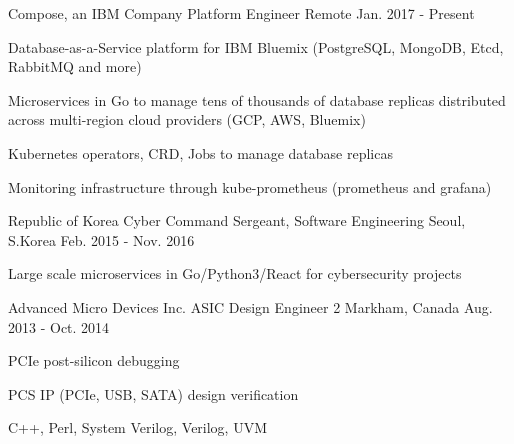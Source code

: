 

\begin{cventries}

  \cventry
    {Compose, an IBM Company} %
    {Platform Engineer} %
    {Remote} %
    {Jan. 2017 - Present} %
    {
      \begin{cvitems} %
        \item {Database-as-a-Service platform for IBM Bluemix (PostgreSQL, MongoDB, Etcd, RabbitMQ and more)}
        \item {Microservices in Go to manage tens of thousands of database replicas distributed across multi-region cloud providers (GCP, AWS, Bluemix)}
        \item {Kubernetes operators, CRD, Jobs to manage database replicas}        
        \item {Monitoring infrastructure through kube-prometheus (prometheus and grafana)}
      \end{cvitems}
    }

  \cventry
    {Republic of Korea Cyber Command} %
    {Sergeant, Software Engineering} %
    {Seoul, S.Korea} %
    {Feb. 2015 - Nov. 2016} %
    {
      \begin{cvitems} %
        \item {Large scale microservices in Go/Python3/React for cybersecurity projects}
      \end{cvitems}
    }

  \cventry
    {Advanced Micro Devices Inc.} %
    {ASIC Design Engineer 2} %
    {Markham, Canada} %
    {Aug. 2013 - Oct. 2014} %
    {
      \begin{cvitems} %
        \item {PCIe post-silicon debugging}
        \item {PCS IP (PCIe, USB, SATA) design verification}
        \item {C++, Perl, System Verilog, Verilog, UVM}
      \end{cvitems}
    }


\end{cventries}
